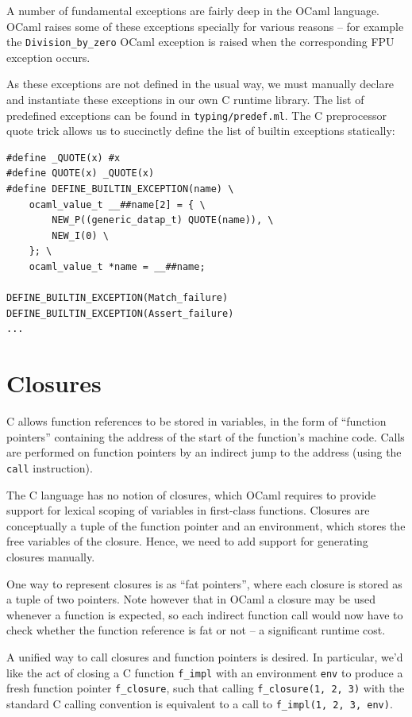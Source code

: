 \documentclass[12pt,a4paper,twoside,openright]{report}
\begin{document}
A number of fundamental exceptions are fairly deep in the OCaml
language. OCaml raises some of these exceptions specially for various reasons --
for example the \lstinline!Division_by_zero! OCaml exception is raised when the
corresponding FPU exception occurs.

As these exceptions are not defined in the usual way, we must
manually declare and instantiate these exceptions in our own C runtime library.
The list of predefined exceptions can be found in \lstinline!typing/predef.ml!.
The C preprocessor quote trick allows us to succinctly define the list of
builtin exceptions statically:

\begin{lstlisting}
#define _QUOTE(x) #x
#define QUOTE(x) _QUOTE(x)
#define DEFINE_BUILTIN_EXCEPTION(name) \
    ocaml_value_t __##name[2] = { \
        NEW_P((generic_datap_t) QUOTE(name)), \
        NEW_I(0) \
    }; \
    ocaml_value_t *name = __##name;

DEFINE_BUILTIN_EXCEPTION(Match_failure)
DEFINE_BUILTIN_EXCEPTION(Assert_failure)
...
\end{lstlisting}

\section{Closures}\label{closures}

C allows function references to be stored in variables, in the form of
``function pointers'' containing the address of the start of the function's
machine code. Calls are performed on function pointers by an indirect jump to
the address (using the \lstinline!call! instruction).

The C language has no notion of closures, which OCaml requires to provide
support for lexical scoping of variables in first-class functions. Closures are
conceptually a tuple of the function pointer and an environment, which stores
the free variables of the closure. Hence, we need to add support for generating
closures manually.

One way to represent closures is as ``fat pointers'', where each closure is
stored as a tuple of two pointers. Note however that in OCaml a closure may be
used whenever a function is expected, so each indirect function call would now
have to check whether the function reference is fat or not -- a significant
runtime cost.

A unified way to call closures and function pointers is desired. In
particular, we'd like the act of closing a C function \lstinline!f_impl! with
an environment \lstinline!env! to produce a fresh function pointer
\lstinline!f_closure!, such that calling
\lstinline!f_closure(1, 2, 3)!
with the standard C calling convention is equivalent to a call to
\lstinline!f_impl(1, 2, 3, env)!.
\end{document}
